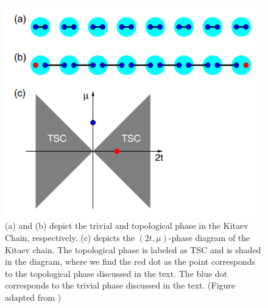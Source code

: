 \documentclass[11pt, oneside]{book}
\theoremstyle{break}
\theoremstyle{break}
\begin{document}
\begin{figure}[h]
  \centering
  \includegraphics[scale=0.6]{1}
  \caption{\small (a) and (b) depict the trivial and topological phase in the Kitaev Chain, respectively. (c) depicts the $(2t,\mu)$-phase diagram of the Kitaev chain. The topological phase is labeled as TSC and is shaded in the diagram, where we find the red dot as the point corresponds to the topological phase discussed in the text. The blue dot corresponds to the trivial phase discussed in the text. (Figure adapted from \cite{Review})\normalsize} 
\end{figure}
\end{document}
